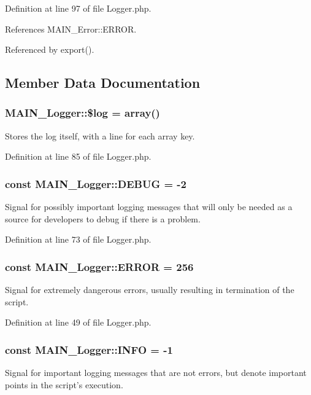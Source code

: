 Definition at line 97 of file Logger.php.

References MAIN\_\-Error::ERROR.

Referenced by export().

\subsection{Member Data Documentation}
\hypertarget{classMAIN__Logger_afa86bba01c2165e0cb2aaa9faaae372b}{
\subsubsection[{\$log}]{\setlength{\rightskip}{0pt plus 5cm}MAIN\_\-Logger::\$log = array()}}
\label{d3/dff/classMAIN__Logger_afa86bba01c2165e0cb2aaa9faaae372b}
Stores the log itself, with a line for each array key. 

Definition at line 85 of file Logger.php.\hypertarget{classMAIN__Logger_ac7a1e837542ce1762a63d2713060c4ae}{
\subsubsection[{DEBUG}]{\setlength{\rightskip}{0pt plus 5cm}const {\bf MAIN\_\-Logger::DEBUG} = -\/2}}
\label{d3/dff/classMAIN__Logger_ac7a1e837542ce1762a63d2713060c4ae}
Signal for possibly important logging messages that will only be needed as a source for developers to debug if there is a problem. 

Definition at line 73 of file Logger.php.\hypertarget{classMAIN__Logger_a2af8dfdb8d9e1b23122783c5d85e2da0}{
\subsubsection[{ERROR}]{\setlength{\rightskip}{0pt plus 5cm}const {\bf MAIN\_\-Logger::ERROR} = 256}}
\label{d3/dff/classMAIN__Logger_a2af8dfdb8d9e1b23122783c5d85e2da0}
Signal for extremely dangerous errors, usually resulting in termination of the script. 

Definition at line 49 of file Logger.php.\hypertarget{classMAIN__Logger_a7583fcdf96a9dba7c0ec52637e1d11d7}{
\subsubsection[{INFO}]{\setlength{\rightskip}{0pt plus 5cm}const {\bf MAIN\_\-Logger::INFO} = -\/1}}
\label{d3/dff/classMAIN__Logger_a7583fcdf96a9dba7c0ec52637e1d11d7}
Signal for important logging messages that are not errors, but denote important points in the script's execution. 

